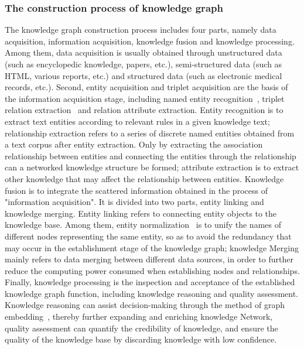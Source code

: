 \subsubsection{ The construction process of knowledge graph}

The knowledge graph construction process includes four parts, namely data acquisition, information acquisition, knowledge fusion and knowledge processing. Among them, data acquisition is usually obtained through unstructured data (such as encyclopedic knowledge, papers, etc.), semi-structured data (such as HTML, various reports, etc.) and structured data (such as electronic medical records, etc.). Second, entity acquisition and triplet acquisition are the basis of the information acquisition stage, including named entity recognition~\cite{Kova2013Combining, 2013Recognizing}, triplet relation extraction~\cite{2017Learning} and relation attribute extraction. Entity recognition is to extract text entities according to relevant rules in a given knowledge text; relationship extraction refers to a series of discrete named entities obtained from a text corpus after entity extraction. Only by extracting the association relationship between entities and connecting the entities through the relationship can a networked knowledge structure be formed; attribute extraction is to extract other knowledge that may affect the relationship between entities. Knowledge fusion is to integrate the scattered information obtained in the process of "information acquisition". It is divided into two parts, entity linking and knowledge merging. Entity linking refers to connecting entity objects to the knowledge base. Among them, entity normalization~\cite{2017CNN, 2017A} is to unify the names of different nodes representing the same entity, so as to avoid the redundancy that may occur in the establishment stage of the knowledge graph; knowledge Merging mainly refers to data merging between different data sources, in order to further reduce the computing power consumed when establishing nodes and relationships. Finally, knowledge processing is the inspection and acceptance of the established knowledge graph function, including knowledge reasoning and quality assessment. Knowledge reasoning can assist decision-making through the method of graph embedding~\cite{2017Safe, 2019PrTransH}, thereby further expanding and enriching knowledge Network, quality assessment can quantify the credibility of knowledge, and ensure the quality of the knowledge base by discarding knowledge with low confidence.

